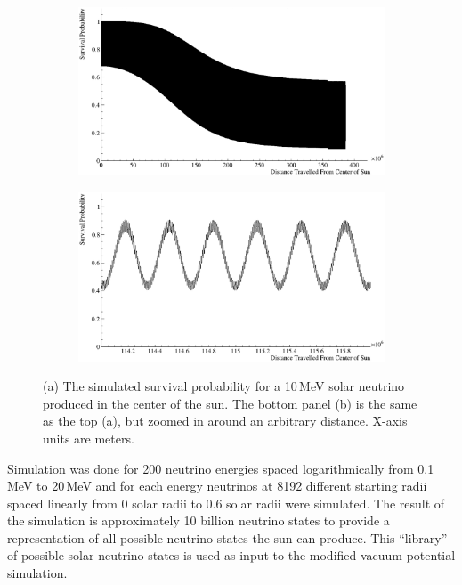 \begin{figure}[htbp]
\centering
\begin{subfigure}[b]{0.88\textwidth}
\centering
\includegraphics[width=\textwidth]{SolarNeutrino_example.eps}
\caption{}
\end{subfigure}

\begin{subfigure}[b]{0.88\textwidth}
\centering
\includegraphics[width=\textwidth]{SolarNeutrino_zoomed_example.eps}
\caption{}
\end{subfigure}
\caption[Example Neutrino State Simulation]{(a) The simulated survival probability for a 10\,MeV solar neutrino produced
in the center of the sun. The bottom panel (b) is the same as the top (a), but zoomed
 in around an arbitrary distance. X-axis units are meters.}
\label{fig:sim_example}
\end{figure}

Simulation was done for 200 neutrino energies spaced logarithmically from
0.1\,MeV to 20\,MeV and for each energy neutrinos at 8192 different starting radii spaced linearly from 0
solar radii to 0.6 solar radii were simulated.
The result of the simulation is approximately 10 billion neutrino states
to provide a representation of all possible neutrino states the sun can produce.
This ``library'' of possible solar neutrino states
is used as input to the modified vacuum potential simulation.

